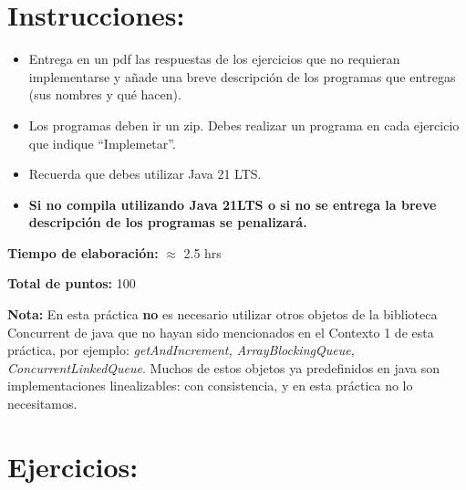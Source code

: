 \section*{Instrucciones:}

\begin{itemize}
    \item Entrega en un pdf las respuestas de los ejercicios que no requieran implementarse y añade una breve descripción de los programas que entregas (sus nombres y qué hacen).
    
    \item Los programas deben ir un zip. Debes realizar un programa en cada ejercicio que indique “Implemetar”.

    \item Recuerda que debes utilizar Java 21 LTS.

    \item \textbf{Si no compila utilizando Java 21LTS o si no se entrega la breve descripción de los
    programas se penalizará.}
\end{itemize}

\textbf{Tiempo de elaboración:} $\approx$ 2.5 hrs

\textbf{Total de puntos:} 100

\textbf{Nota:} En esta práctica \textbf{no} es necesario utilizar otros objetos de la biblioteca Concurrent de java que no hayan sido mencionados en el Contexto 1 de esta práctica, por ejemplo: \textit{getAndIncrement, ArrayBlockingQueue, ConcurrentLinkedQueue}. Muchos de estos objetos ya predefinidos en java son implementaciones linealizables: con consistencia, y en esta práctica no lo  necesitamos.

\section*{Ejercicios:}

